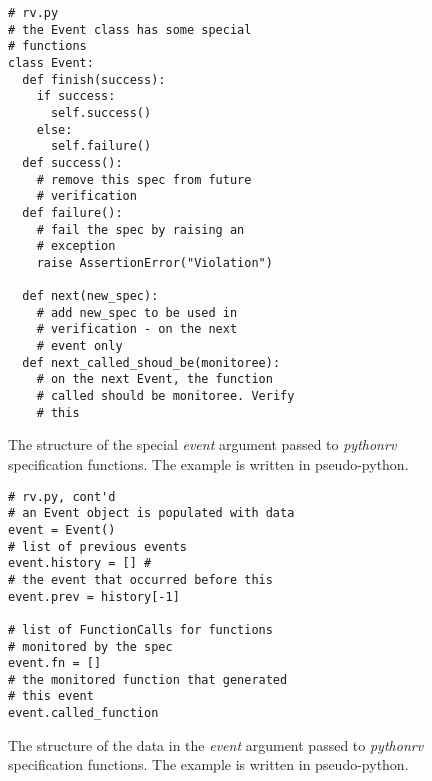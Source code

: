 \documentclass[a4paper,11pt]{kth-mag}
\theoremstyle{definition}
\begin{document}
\begin{figure}[h!]
	\begin{center}
	\begin{minipage}{0.7\textwidth}
	\begin{lstlisting}
# rv.py
# the Event class has some special
# functions
class Event:
  def finish(success):
    if success:
      self.success()
    else:
      self.failure()
  def success():
    # remove this spec from future
    # verification
  def failure():
    # fail the spec by raising an
    # exception
    raise AssertionError("Violation")

  def next(new_spec):
    # add new_spec to be used in
    # verification - on the next
    # event only
  def next_called_shoud_be(monitoree):
    # on the next Event, the function
    # called should be monitoree. Verify
    # this
	\end{lstlisting}
	\end{minipage}
	\end{center}

  \caption{The structure of the special \textit{event} argument passed to
    \textit{pythonrv} specification functions. The example is written in
    pseudo-python.}
	\label{figure-event-functions}
\end{figure}

\begin{figure}[h!]
	\begin{center}
	\begin{minipage}{0.7\textwidth}
	\begin{lstlisting}
# rv.py, cont'd
# an Event object is populated with data
event = Event()
# list of previous events
event.history = [] #
# the event that occurred before this
event.prev = history[-1]

# list of FunctionCalls for functions
# monitored by the spec
event.fn = []
# the monitored function that generated
# this event
event.called_function
	\end{lstlisting}
	\end{minipage}
	\end{center}

  \caption{The structure of the data in the \textit{event} argument passed to
    \textit{pythonrv} specification functions. The example is written in
    pseudo-python.}
	\label{figure-event-data}
\end{figure}
\end{document}
